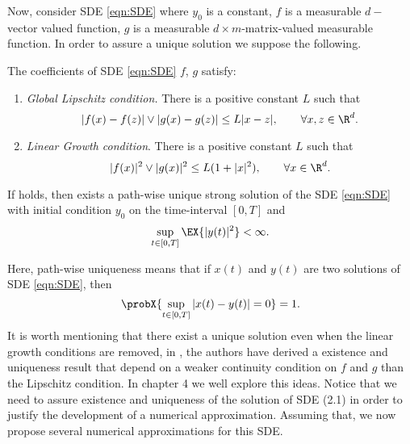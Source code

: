 Now,  consider SDE \eqref{eqn:SDE} where $y_0$ is a constant, $f$ is a measurable
$d-$vector valued function, $g$ is a measurable $d\times m$-matrix-valued measurable function.
In order to assure a unique solution we suppose the following.
\begin{assumption}\label{ass:ClassicExisAndUniqueness}
		The coefficients of SDE \eqref{eqn:SDE} $f$, $g$ satisfy: 
	\begin{enumerate}[(EU1)]
		\item \emph{Global Lipschitz condition.}
			There is a positive constant $L$ such that
			$$
				|f(x)-f(z)| \vee |g(x)-g(z)|\leq L|x-z|, \qquad \forall x,z \in \R^d.
			$$
		\item \emph{Linear Growth condition}. There is a positive constant $L$ such that
			$$
				|f(x)|^ 2 \vee |g(x)|^ 2 \leq L(1+|x|^2), \qquad \forall x \in \R^d.
			$$
	\end{enumerate}
\end{assumption}
\begin{thm}
	If  holds, then exists a path-wise unique strong solution of the SDE
	\eqref{eqn:SDE} with initial condition $y_0$ on the time-interval $[0, T]$ and
	\begin{equation}
		\sup_{t\in [0,T]} \EX{|y(t)|^2} < \infty.
	\end{equation}
\end{thm}
	Here, path-wise uniqueness means that if $x(t)$ and $y(t)$ are two solutions of SDE \eqref{eqn:SDE}, then
	$$
		\probX{
			\sup_{t\in [0,T]}
				|x(t)-y(t)|=0
			}=1.
	$$
	It is worth mentioning that  there exist a unique solution even when the linear growth conditions are removed, in
\cite{Higham2002b}, the authors have derived a existence and uniqueness result that depend on a weaker
continuity condition on $f$ and $g$ than the Lipschitz condition. In chapter 4 we well explore this ideas.
Notice that we need to  assure  existence and uniqueness of the solution  of  SDE (2.1)  in order to justify the 
development of a numerical approximation.  Assuming that,  we now propose several numerical approximations for  this 
SDE.
